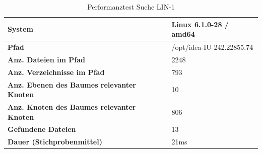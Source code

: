 \documentclass[a4paper,12pt]{report}
\begin{document}
    \begin{table}[h!]
        \centering
        \setlength{\leftmargini}{0.8cm}
        \begin{tabular}{|p{7cm}|p{5cm}|}
            \hline
            \textbf{System}                                            & Linux 6.1.0-28 / amd64    \\ \hline
            \textbf{Pfad}                                              & /opt/idea-IU-242.22855.74 \\ \hline
            \textbf{Anz. Dateien im Pfad}                              & 2248                      \\ \hline
            \textbf{Anz. Verzeichnisse im Pfad}                        & 793                       \\ \hline
            \textbf{Anz. Ebenen \newline des Baumes relevanter Knoten} & 10                        \\ \hline
            \textbf{Anz. Knoten \newline des Baumes relevanter Knoten} & 806                       \\ \hline
            \textbf{Gefundene Dateien}                                 & 13                        \\ \hline
            \textbf{Dauer (Stichprobenmittel)}                         & 21ms                      \\ \hline
        \end{tabular}
        \caption{Performanztest Suche LIN-1}\label{tab:perf-search-lin-1}
    \end{table}
\end{document}
